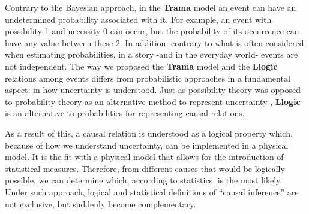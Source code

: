 \documentclass[
		twoside,openright,titlepage,numbers=noenddot,manychapters,
		headinclude,%
                footinclude=false,cleardoublepage=empty,
                BCOR=5mm,
		fontsize=11pt, %
                 enabledeprecatedfontcommands]{scrreprt}
\begin{document}
Contrary to the Bayesian approach,  in the \textbf{Trama} model an event can have an undetermined probability associated with it. For example, an event with possibility 1 and necessity 0 can occur, but the probability of its occurrence can have any value between these 2.  
In addition, contrary to what is often considered when estimating probabilities, in a story -and in the everyday world- events are not independent.%
The way we proposed the \textbf{Trama} model and the \textbf{Llogic} relations among events differs from probabilistic approaches in a fundamental aspect: in how uncertainty is understood. Just as possibility theory was opposed to probability theory as an alternative method to represent uncertainty \cite[]{zadeh1999fuzzy}, \textbf{Llogic} is  an alternative to probabilities for  representing causal relations.



As a result of this, a causal relation is understood as a logical property which, because of how we understand uncertainty, can be implemented in a physical model. It is the fit with a physical model that allows for the introduction of statistical measures. Therefore, from different causes that would be logically possible, we can determine which, according to statistics, is the most likely.   Under such approach, logical and statistical definitions of ``causal inference'' are not exclusive, but suddenly become complementary.





\end{document}
